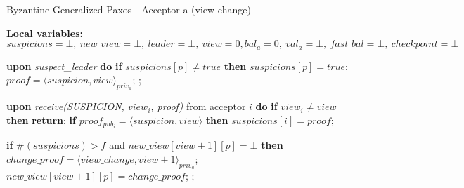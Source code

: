 \begin{algorithm} 
	\caption{Byzantine Generalized Paxos - Acceptor a (view-change)}
	\label{BFT-Proc}
	\textbf{Local variables:} $suspicions = \bot,\ new\_view = \bot,\ leader = \bot,\ view = 0, bal_a = 0,\ val_a = \bot,\ fast\_bal = \bot,\ checkpoint=\bot$
	\vspace*{-.5cm}
	\begin{multicols}{2}
		\begin{algorithmic}[1]
			
			\State \textbf{upon} \textit{suspect\_leader} \textbf{do} 
			\State\hspace{\algorithmicindent} \textbf{if} $suspicions[p] \neq true$ \textbf{then}
			\State\hspace{\algorithmicindent}\hspace{\algorithmicindent} $suspicions[p] = true$;
			\State\hspace{\algorithmicindent}\hspace{\algorithmicindent} $proof = \langle suspicion, view \rangle_{priv_a}$;
			\State \hspace{\algorithmicindent}\hspace{\algorithmicindent} ;	
			\State
			
			\State \textbf{upon} \textit{receive(SUSPICION, $view_i$, proof)} from acceptor $i$ \textbf{do} 
			\State\hspace{\algorithmicindent} \textbf{if} $view_i \neq view$ \textbf{then}
			\State\hspace{\algorithmicindent}\hspace{\algorithmicindent} \textbf{return};
			\State\hspace{\algorithmicindent} \textbf{if} $proof_{pub_i} = \langle suspicion, view \rangle$ \textbf{then}
			\State\hspace{\algorithmicindent}\hspace{\algorithmicindent} $suspicions[i] = proof$;

			\State\hspace{\algorithmicindent} \textbf{if} $\#(suspicions) > f$ and $new\_view[view+1][p] = \bot$ \textbf{then}
			\State\hspace{\algorithmicindent}\hspace{\algorithmicindent} $change\_proof = \langle view\_change, view +1 \rangle_{priv_a}$;
			\State\hspace{\algorithmicindent}\hspace{\algorithmicindent} $new\_view[view+1][p] = change\_proof$;
			\State\hspace{\algorithmicindent}\hspace{\algorithmicindent} ;
			\State
			

\end{algorithmic}
\end{multicols}
\end{algorithm}
